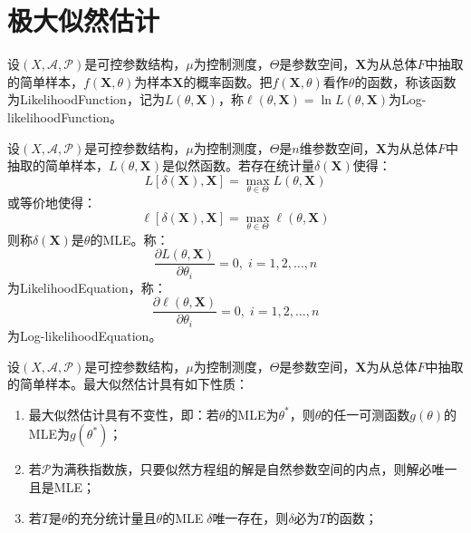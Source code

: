 \section{极大似然估计}

\begin{definition}
	设$(X,\mathscr{A},\mathscr{P})$是可控参数结构，$\mu$为控制测度，$\Theta$是参数空间，$\mathbf{X}$为从总体$F$中抽取的简单样本，$f(\mathbf{X},\theta)$为样本$\mathbf{X}$的概率函数。把$f(\mathbf{X},\theta)$看作$\theta$的函数，称该函数为\gls{LikelihoodFunction}，记为$L(\theta,\mathbf{X})$，称$\ell(\theta,\mathbf{X})=\ln L(\theta,\mathbf{X})$为\gls{Log-likelihoodFunction}。
\end{definition}
\begin{definition}
	设$(X,\mathscr{A},\mathscr{P})$是可控参数结构，$\mu$为控制测度，$\Theta$是$n$维参数空间，$\mathbf{X}$为从总体$F$中抽取的简单样本，$L(\theta,\mathbf{X})$是似然函数。若存在统计量$\delta(\mathbf{X})$使得：
	\begin{equation*}
		L[\delta(\mathbf{X}),\mathbf{X}]=\max_{\theta\in\Theta}L(\theta,\mathbf{X})
	\end{equation*}
	或等价地使得：
	\begin{equation*}
		\ell[\delta(\mathbf{X}),\mathbf{X}]=\max_{\theta\in\Theta}\ell(\theta,\mathbf{X})
	\end{equation*}
	则称$\delta(\mathbf{X})$是$\theta$的\gls{MLE}。称：
	\begin{equation*}
		\frac{\partial L(\theta,\mathbf{X})}{\partial\theta_i}=0,\; i=1,2,\dots,n
	\end{equation*}
	为\gls{LikelihoodEquation}，称：
	\begin{equation*}
		\frac{\partial \ell(\theta,\mathbf{X})}{\partial\theta_i}=0,\; i=1,2,\dots,n
	\end{equation*}
	为\gls{Log-likelihoodEquation}。
\end{definition}
\begin{property}\label{prop:MLE}
	设$(X,\mathscr{A},\mathscr{P})$是可控参数结构，$\mu$为控制测度，$\Theta$是参数空间，$\mathbf{X}$为从总体$F$中抽取的简单样本。最大似然估计具有如下性质：
	\begin{enumerate}
		\item 最大似然估计具有不变性，即：若$\theta$的MLE为$\theta^*$，则$\theta$的任一可测函数$g(\theta)$的MLE为$g(\theta^*)$；
		\item 若$\mathscr{P}$为满秩指数族，只要似然方程组的解是自然参数空间的内点，则解必唯一且是MLE；
		\item 若$T$是$\theta$的充分统计量且$\theta$的MLE$\;\delta$唯一存在，则$\delta$必为$T$的函数；
	\end{enumerate}
\end{property}
